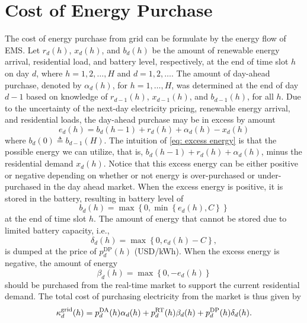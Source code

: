 \section{Cost of Energy Purchase}\label{sec: Cost of Energy Purchase}

The cost of energy purchase from grid can be formulate by the energy flow of EMS. Let $r_d(h)$, $x_d(h)$, and $b_d(h)$ be the amount of renewable energy arrival, residential load, and battery level, respectively, at the end of time slot $h$ on day $d$, where $h = 1, 2, \ldots, H$ and $d = 1, 2, \ldots$. The amount of day-ahead purchase, denoted by $\alpha_d(h)$, for $h=1,\ldots, H$, was determined at the end of day $d-1$ based on knowledge of $r_{d-1}(h)$, $x_{d-1}(h)$, and $b_{d-1}(h)$, for all $h$. Due to the uncertainty of the next-day electricity pricing, renewable energy arrival, and residential loads, the day-ahead purchase may be in excess by amount
\begin{equation}\label{eq: excess energy}
    e_d(h) = b_d(h-1) + r_d(h) + \alpha_d(h) - x_d(h)
\end{equation}
where $b_d(0)\triangleq b_{d-1}(H)$. The intuition of \eqref{eq: excess energy} is that the possible energy we can utilize, that is, $b_d(h-1) + r_d(h) + \alpha_d(h)$, minus the residential demand $x_d(h)$. Notice that this excess energy can be either positive or negative depending on whether or not energy is over-purchased or under-purchased in the day ahead market. When the excess energy is positive, it is stored in the battery, resulting in battery level of
\begin{equation}
    b_d(h) = \max\left\{0,\min\left\{e_d(h),C\right\}\right\}
\end{equation}
at the end of time slot $h$. The amount of energy that cannot be stored due to limited battery capacity, i.e.,
\begin{equation}
\delta_d(h) =
\max\left\{0,e_d(h)-C\right\},
\end{equation}
is dumped at the price of $p_d^{\text{DP}}(h)$ (USD/kWh).
When the excess energy is negative, the amount of energy
\begin{equation}
    \beta_d(h) = \max\left\{0,-e_d(h)\right\}
\end{equation}
should be purchased from the real-time market to support the current residential demand. The total cost of purchasing electricity from the market is thus given by
\begin{equation}\label{eq: cost of purchasing electricity from the market}
\kappa^\text{grid}_d(h) = p^{\text{DA}}_d(h)\alpha_d(h)+p^{\text{RT}}_d(h)\beta_d(h)+p^\text{DP}_d(h)\delta_d(h).
\end{equation}

